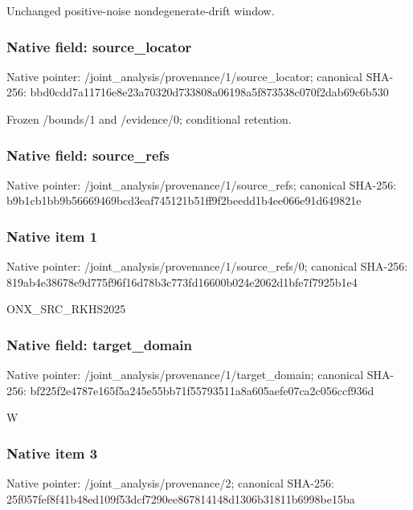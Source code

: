 \documentclass[10pt,a4paper]{article}
\begin{document}
\begingroup\raggedright\sloppy Unchanged positive-noise nondegenerate-drift window.\par\endgroup

\subsubsection{Native field: source\_\allowbreak{}locator}
Native pointer: /joint\_\allowbreak{}analysis/provenance/1/source\_\allowbreak{}locator; canonical SHA-256: bbd0cdd7a11716e8e23a70320d733808a06198a5f873538c070f2dab69c6b530

\begingroup\raggedright\sloppy Frozen /\allowbreak{}bounds/\allowbreak{}1 and /\allowbreak{}evidence/\allowbreak{}0;\allowbreak{} conditional retention.\par\endgroup

\subsubsection{Native field: source\_\allowbreak{}refs}
Native pointer: /joint\_\allowbreak{}analysis/provenance/1/source\_\allowbreak{}refs; canonical SHA-256: b9b1cb1bb9b56669469bcd3eaf745121b51ff9f2beedd1b4ee066e91d649821e

\subsubsection{Native item 1}
Native pointer: /joint\_\allowbreak{}analysis/provenance/1/source\_\allowbreak{}refs/0; canonical SHA-256: 819ab4e38678e9d775f96f16d78b3c773fd16600b024e2062d1bfe7f7925b1e4

\begingroup\raggedright\sloppy ONX\_\allowbreak{}SRC\_\allowbreak{}RKHS2025\par\endgroup

\subsubsection{Native field: target\_\allowbreak{}domain}
Native pointer: /joint\_\allowbreak{}analysis/provenance/1/target\_\allowbreak{}domain; canonical SHA-256: bf225f2e4787e165f5a245e55bb71f55793511a8a605aefe07ca2c056ccf936d

\begingroup\raggedright\sloppy W\par\endgroup

\subsubsection{Native item 3}
Native pointer: /joint\_\allowbreak{}analysis/provenance/2; canonical SHA-256: 25f057fef8f41b48ed109f53dcf7290ee867814148d1306b31811b6998be15ba
\end{document}
